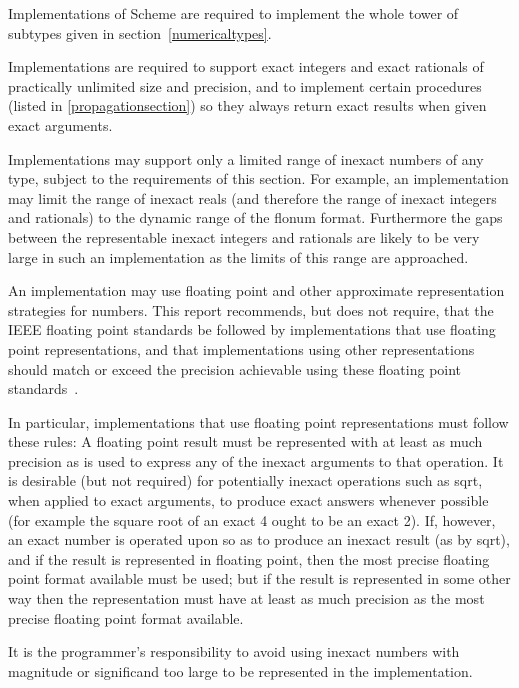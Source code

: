 \label{restrictions}

\vest Implementations of Scheme are required to implement the whole
tower of subtypes given in section~\ref{numericaltypes}.

\vest Implementations are required to support
exact integers and exact rationals of
practically unlimited size and precision, and to implement
certain procedures (listed in \ref{propagationsection})
so they always return exact results when given exact
arguments.

\vest Implementations may support only a limited range of
inexact numbers of
any type, subject to the requirements of this section.  For example,
an implementation may
limit the range of inexact reals (and therefore
the range of inexact integers and rationals)
to the dynamic range of the flonum format.
Furthermore
the gaps between the representable inexact integers and
rationals are
likely to be very large in such an implementation as the limits of this
range are approached.

\vest An implementation may use floating point and other approximate 
representation strategies for  numbers.
This report recommends, but does not require, that the IEEE 
floating point standards be followed by implementations that use
floating point representations, and that implementations using
other representations should match or exceed the precision achievable
using these floating point standards~\cite{IEEE}.

\vest In particular, implementations that use floating point
representations must follow these rules: A floating point result
must be represented with at least as much precision as is
used to express any of the inexact arguments to that operation.
It is desirable (but not required) for
potentially inexact operations such as {\cf sqrt}, when applied to exact
arguments, to produce exact answers whenever possible (for example the
square root of an exact 4 ought to be an exact 2).
If, however, an
exact number is operated upon so as to produce an inexact result
(as by {\cf sqrt}), and if the result is represented in floating
point, then the most precise floating point format available
must be used; but if the result
is represented in some other way then the representation must have
at least as much precision as the most precise
floating point format available.

It is the programmer's responsibility to avoid using inexact numbers
with magnitude or significand too large to be represented in the
implementation.

